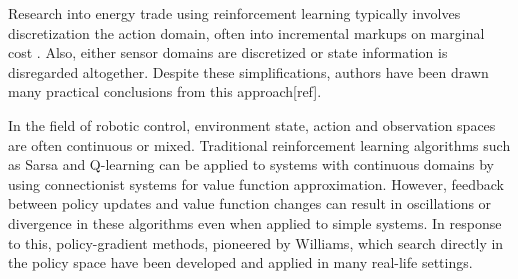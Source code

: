 Research into energy trade using reinforcement learning typically
involves discretization the action domain, often into incremental markups
on marginal cost \cite{anke:2008}. Also, either sensor domains are discretized
or state information is disregarded altogether.  Despite these simplifications,
authors have been drawn many practical conclusions from this approach[ref].

In the field of robotic control, environment state, action and observation
spaces are often continuous or mixed.
Traditional reinforcement learning algorithms such as Sarsa and Q-learning can
be applied to systems with continuous domains by using connectionist systems
for value function approximation\cite{barto:neuron}. However, feedback
between policy updates and value function changes can result in oscillations
or divergence in these algorithms even when applied to simple
systems\cite{peters:enac}.  In response to this, policy-gradient methods,
pioneered by Williams\cite{williams:reinforce}, which search directly in the
policy space have been developed and applied in many real-life
settings\cite{barto:policy,shaal:robots,moody:direct,peshkin:routing}.

